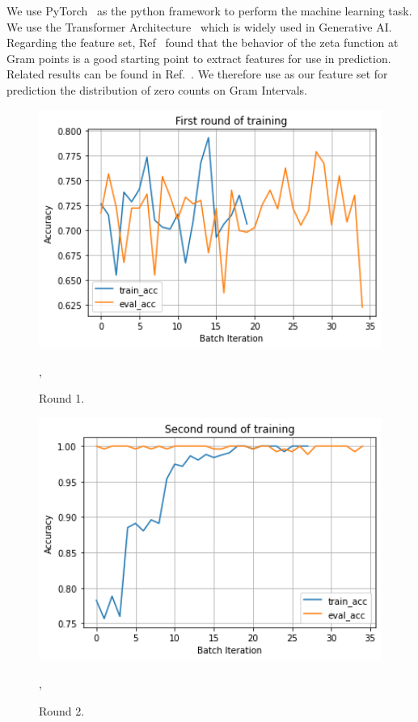 \documentclass[twoside]{article}
\begin{document}
We use PyTorch~\cite{pytorch} as the python framework to perform the machine learning 
task. We use the Transformer Architecture~\cite{vaswani} which is widely used in Generative AI.
Regarding the feature set, 
Ref~\cite{osneural,Shanker 2018a} found that the behavior of the zeta function at Gram points 
is a good starting point to extract features for use in prediction. 
Related  results can be found in Ref.~\cite{oscue, os6, Shanker 2018b,Shanker 2020}. We therefore
use as our feature set for prediction the distribution of zero counts on Gram Intervals.



\begin{figure}
\includegraphics[width=1.0\textwidth]{Round1.png}
\caption[]{ 
 Round 1.
 }
\vspace{1mm}, 
\label{fig:round1}
\end{figure}


\begin{figure}
\includegraphics[width=1.0\textwidth]{Round2.png}
\caption[]{ 
 Round 2.
 }
\vspace{1mm}, 
\label{fig:round2}
\end{figure}
\end{document}
